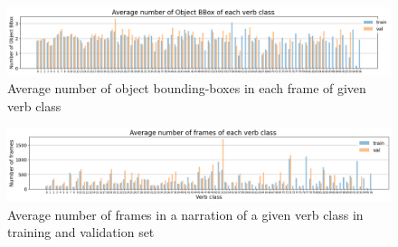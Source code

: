 \begin{figure}[htp!]
    \begin{minipage}[b]{1\textwidth}
        \centering
        \includegraphics[scale=0.38]{figures/avg_number_Object_bbox_verb_class.png}
        \caption{Average number of object bounding-boxes in each frame of given verb class}
        \label{fig:obj-bbox}
    \end{minipage}
\end{figure}

\begin{figure}[htp!]
    \begin{minipage}[b]{1\textwidth}
        \centering
        \includegraphics[scale=0.38]{figures/avg_number_frames_verb_class.png}
        \caption{Average number of frames in a narration of a given verb class in training and validation set}
        \label{fig:avg-frame}
    \end{minipage}
\end{figure}

